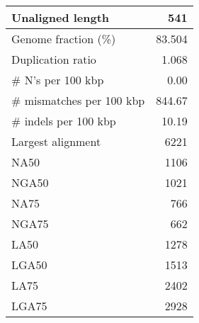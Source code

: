 \documentclass[12pt,a4paper]{article}
\begin{document}
\begin{table}[ht]
\begin{center}
\begin{tabular}{|l*{1}{|r}|}
Unaligned length & 541 \\ \hline
Genome fraction (\%) & 83.504 \\ \hline
Duplication ratio & 1.068 \\ \hline
\# N's per 100 kbp & 0.00 \\ \hline
\# mismatches per 100 kbp & 844.67 \\ \hline
\# indels per 100 kbp & 10.19 \\ \hline
Largest alignment & 6221 \\ \hline
NA50 & 1106 \\ \hline
NGA50 & 1021 \\ \hline
NA75 & 766 \\ \hline
NGA75 & 662 \\ \hline
LA50 & 1278 \\ \hline
LGA50 & 1513 \\ \hline
LA75 & 2402 \\ \hline
LGA75 & 2928 \\ \hline
\end{tabular}
\end{center}
\end{table}
\end{document}
